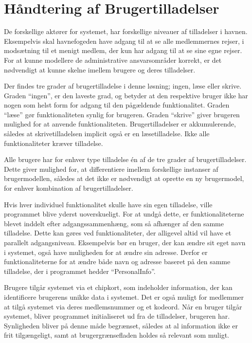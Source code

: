\section{Håndtering af Brugertilladelser} %
\label{tilladelser}

De forskellige aktører for systemet, har forskellige niveauer af tilladelser i havnen. Eksempelvis skal havnefogeden have adgang til at se alle medlemmernes rejser, i modsætning til et menigt medlem, der kun har adgang til at se sine egne rejser. For at kunne modellere de administrative ansvarsområder korrekt, er det nødvendigt at kunne skelne imellem brugere og deres tilladelser.

Der findes tre grader af brugertilladelse i denne løsning; ingen, læse eller skrive. Graden \enquote{ingen}, er den laveste grad, og betyder at den respektive bruger ikke har nogen som helst form for adgang til den pågældende funktionalitet. Graden \enquote{læse} gør funktionaliteten synlig for brugeren. Graden \enquote{skrive} giver brugeren mulighed for at anvende funktionaliteten. Brugertilladelser er akkumulerende, således at skrivetilladelsen implicit også er en læsetilladelse. Ikke alle funktionaliteter kræver tilladelse.

Alle brugere har for enhver type tilladelse én af de tre grader af brugertilladelser. Dette giver mulighed for, at differentiere imellem forskellige instanser af brugermodellen, således at det ikke er nødvendigt at oprette en ny brugermodel, for enhver kombination af brugertilladelser.

Hvis hver individuel funktionalitet skulle have sin egen tilladelse, ville programmet blive yderst uoverskueligt. For at undgå dette, er funktionaliteterne blevet inddelt efter adgangssammenhæng, som så afhænger af den samme tilladelse. Dette kan gøres ved funktionaliteter, der alligevel altid vil have et parallelt adgangsniveau. Eksempelvis bør en bruger, der kan ændre sit eget navn i systemet, også have muligheden for at ændre sin adresse. Derfor er funktionaliteterne for at ændre både navn og adresse baseret på den samme tilladelse, der i programmet hedder \enquote{PersonalInfo}.

Brugere tilgår systemet via et chipkort, som indeholder information, der kan identificere brugerens unikke data i systemet. Det er også muligt for medlemmer at tilgå systemet via deres medlemsnummer og et kodeord. Når en bruger tilgår systemet, bliver programmet initialiseret ud fra de tilladelser, brugeren har. Synligheden bliver på denne måde begrænset, således at al information ikke er frit tilgængeligt, samt at brugergrænsefladen holdes så relevant som muligt.
